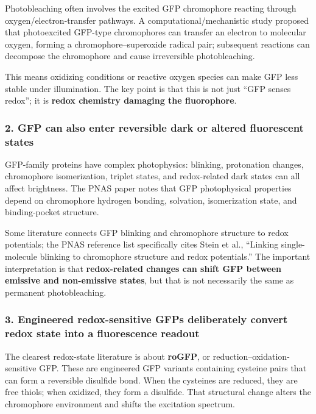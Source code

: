 \documentclass{article}
\begin{document}
Photobleaching often involves the excited GFP chromophore reacting through oxygen/electron-transfer pathways. A computational/mechanistic study proposed that photoexcited GFP-type chromophores can transfer an electron to molecular oxygen, forming a chromophore--superoxide radical pair; subsequent reactions can decompose the chromophore and cause irreversible photobleaching. \href{https://iopenshell.usc.edu/pubs/pdf/jpcb-119-5444.pdf}{\textbullet}

This means oxidizing conditions or reactive oxygen species can make GFP less stable under illumination. The key point is that this is not just ``GFP senses redox''; it is \textbf{redox chemistry damaging the fluorophore}.

\subsubsection*{2. GFP can also enter reversible dark or altered fluorescent states}

GFP-family proteins have complex photophysics: blinking, protonation changes, chromophore isomerization, triplet states, and redox-related dark states can all affect brightness. The PNAS paper notes that GFP photophysical properties depend on chromophore hydrogen bonding, solvation, isomerization state, and binding-pocket structure. \href{https://www.pnas.org/doi/full/10.1073/pnas.1704937114}{\textbullet}

Some literature connects GFP blinking and chromophore structure to redox potentials; the PNAS reference list specifically cites Stein et al., ``Linking single-molecule blinking to chromophore structure and redox potentials.'' \href{https://www.pnas.org/doi/full/10.1073/pnas.1704937114}{\textbullet} The important interpretation is that \textbf{redox-related changes can shift GFP between emissive and non-emissive states}, but that is not necessarily the same as permanent photobleaching.

\subsubsection*{3. Engineered redox-sensitive GFPs deliberately convert redox state into a fluorescence readout}

The clearest redox-state literature is about \textbf{roGFP}, or reduction--oxidation-sensitive GFP. These are engineered GFP variants containing cysteine pairs that can form a reversible disulfide bond. When the cysteines are reduced, they are free thiols; when oxidized, they form a disulfide. That structural change alters the chromophore environment and shifts the excitation spectrum.
\end{document}

